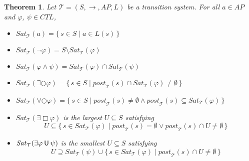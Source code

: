 \documentclass[12pt]{article}
\newcommand{\always}{\Box}
\newcommand{\nxt}{\bigcirc}
\newcommand{\until}{\mathbin{\sf U}}
\newtheorem{theorem}{Theorem}
\theoremstyle{definition}
\begin{document}
\begin{theorem}
\label{theorem:sat-characterization}
Let $\mathcal{T} = (S, \rightarrow, \mathit{AP}, L)$ be a transition system.  For all $a \in \mathit{AP}$ and $\varphi$, $\psi \in \mathit{CTL}$,
\begin{itemize}
\item
$\mathit{Sat}_{\mathcal{T}}(a) = \{\, s \in S \mid a \in L(s) \,\}$
\item
$\mathit{Sat}_{\mathcal{T}}(\neg \varphi)  = S \setminus \mathit{Sat}_{\mathcal{T}}(\varphi)$
\item
$\mathit{Sat}_{\mathcal{T}}(\varphi \wedge \psi) = \mathit{Sat}_{\mathcal{T}}(\varphi) \cap \mathit{Sat}_{\mathcal{T}}(\psi)$
\item
$\mathit{Sat}_{\mathcal{T}}(\exists \nxt \varphi) = \{\, s \in S \mid \mathit{post}_{\mathcal{T}}(s) \cap \mathit{Sat}_{\mathcal{T}}(\varphi) \not= \emptyset \,\}$
\item
$\mathit{Sat}_{\mathcal{T}}(\forall \nxt \varphi) = \{\, s \in S \mid \mathit{post}_{\mathcal{T}}(s) \not= \emptyset \wedge \mathit{post}_{\mathcal{T}}(s) \subseteq \mathit{Sat}_{\mathcal{T}}(\varphi) \,\}$
\item
$\mathit{Sat}_{\mathcal{T}}(\exists \always \varphi)$ is the largest $U \subseteq S$ satisfying
\[
U \subseteq \{\, s \in \mathit{Sat}_{\mathcal{T}}(\varphi) \mid \mathit{post}_{\mathcal{T}}(s) = \emptyset \vee \mathit{post}_{\mathcal{T}}(s) \cap U \not= \emptyset \,\}
\]
\item
$\mathit{Sat}_{\mathcal{T}}(\exists \varphi \until \psi)$ is the smallest $U \subseteq S$ satisfying
\[
U \supseteq \mathit{Sat}_{\mathcal{T}}(\psi) \cup \{\, s \in \mathit{Sat}_{\mathcal{T}}(\varphi) \mid \mathit{post}_{\mathcal{T}}(s) \cap U \not= \emptyset \,\}
\]
\end{itemize}
\end{theorem}
\end{document}
